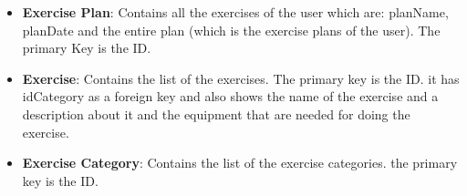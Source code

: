 \begin{itemize}
    \item \textbf{Exercise Plan}: Contains all the exercises of the user which are: planName, planDate and the entire plan (which is the exercise plans of the user). The primary Key is the ID.
    \item \textbf{Exercise}: Contains the list of the exercises. The primary key is the ID. it has idCategory as a foreign key and also shows the name of the exercise and a description about it and the equipment that are needed for doing the exercise.
    \item \textbf{Exercise Category}: Contains the list of the exercise categories. the primary key is the ID.
\end{itemize}